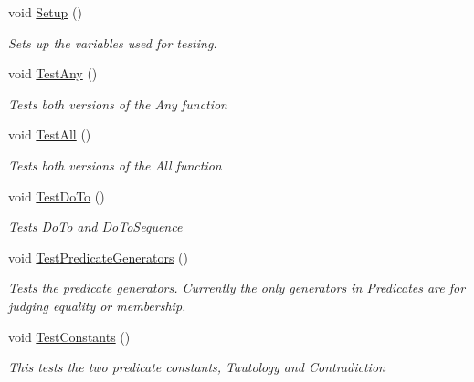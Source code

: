 \begin{DoxyCompactItemize}
\item 
void \hyperlink{classHumDrumTests_1_1Collections_1_1Predicates_a80acbc3096ffc25d141eceb13442f22c}{Setup} ()
\begin{DoxyCompactList}\small\item\em Sets up the variables used for testing. \end{DoxyCompactList}\item 
void \hyperlink{classHumDrumTests_1_1Collections_1_1Predicates_a3f3844173c781245d392563cf47fe74a}{Test\+Any} ()
\begin{DoxyCompactList}\small\item\em Tests both versions of the Any function \end{DoxyCompactList}\item 
void \hyperlink{classHumDrumTests_1_1Collections_1_1Predicates_adb5698404a779c6e2dbcc2e1504a7fe8}{Test\+All} ()
\begin{DoxyCompactList}\small\item\em Tests both versions of the All function \end{DoxyCompactList}\item 
void \hyperlink{classHumDrumTests_1_1Collections_1_1Predicates_aa83624ae52150166b7edd52bc6b5ed4d}{Test\+Do\+To} ()
\begin{DoxyCompactList}\small\item\em Tests Do\+To and Do\+To\+Sequence \end{DoxyCompactList}\item 
void \hyperlink{classHumDrumTests_1_1Collections_1_1Predicates_afa0da270cfbb7fec7579d6744eb07bac}{Test\+Predicate\+Generators} ()
\begin{DoxyCompactList}\small\item\em Tests the predicate generators. Currently the only generators in \hyperlink{classHumDrumTests_1_1Collections_1_1Predicates}{Predicates} are for judging equality or membership. \end{DoxyCompactList}\item 
void \hyperlink{classHumDrumTests_1_1Collections_1_1Predicates_aa1910e9bf3d64229dcfe5e3dfbd54fff}{Test\+Constants} ()
\begin{DoxyCompactList}\small\item\em This tests the two predicate constants, Tautology and Contradiction \end{DoxyCompactList}\end{DoxyCompactItemize}


